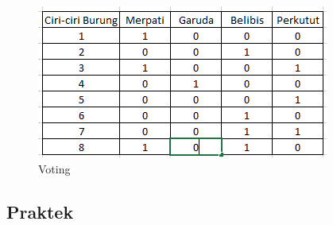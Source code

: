 \begin{enumerate}
\begin{figure}[ht]
\centering
\includegraphics[scale=0.9]{figures/RF/1_2.png}
\caption{Voting}
\end{figure}
\end{enumerate}
\subsection{Praktek}
